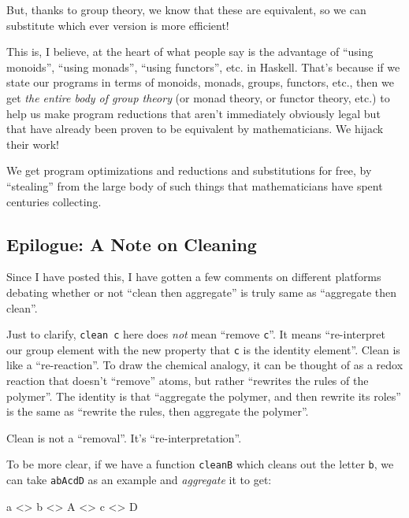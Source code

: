 \documentclass[]{article}
\newenvironment{Shaded}{}{}
\newcommand{\DataTypeTok}[1]{\textcolor[rgb]{0.56,0.13,0.00}{#1}}
\newcommand{\NormalTok}[1]{#1}
\newcommand{\OperatorTok}[1]{\textcolor[rgb]{0.40,0.40,0.40}{#1}}
\begin{document}
But, thanks to group theory, we know that these are equivalent, so we can
substitute which ever version is more efficient!

This is, I believe, at the heart of what people say is the advantage of ``using
monoids'', ``using monads'', ``using functors'', etc. in Haskell. That's because
if we state our programs in terms of monoids, monads, groups, functors, etc.,
then we get \emph{the entire body of group theory} (or monad theory, or functor
theory, etc.) to help us make program reductions that aren't immediately
obviously legal but that have already been proven to be equivalent by
mathematicians. We hijack their work!

We get program optimizations and reductions and substitutions for free, by
``stealing'' from the large body of such things that mathematicians have spent
centuries collecting.

\hypertarget{epilogue-a-note-on-cleaning}{%
\subsection{Epilogue: A Note on Cleaning}\label{epilogue-a-note-on-cleaning}}

Since I have posted this, I have gotten a few comments on different platforms
debating whether or not ``clean then aggregate'' is truly same as ``aggregate
then clean''.

Just to clarify, \texttt{clean\ c} here does \emph{not} mean ``remove
\texttt{c}''. It means ``re-interpret our group element with the new property
that \texttt{c} is the identity element''. Clean is like a ``re-reaction''. To
draw the chemical analogy, it can be thought of as a redox reaction that doesn't
``remove'' atoms, but rather ``rewrites the rules of the polymer''. The identity
is that ``aggregate the polymer, and then rewrite its roles'' is the same as
``rewrite the rules, then aggregate the polymer''.

Clean is not a ``removal''. It's ``re-interpretation''.

To be more clear, if we have a function \texttt{cleanB} which cleans out the
letter \texttt{b}, we can take \texttt{abAcdD} as an example and
\emph{aggregate} it to get:

\begin{Shaded}
\begin{Highlighting}[]
\NormalTok{a }\OperatorTok{<>}\NormalTok{ b }\OperatorTok{<>} \DataTypeTok{A} \OperatorTok{<>}\NormalTok{ c }\OperatorTok{<>} \DataTypeTok{D}
\end{Highlighting}
\end{Shaded}
\end{document}
